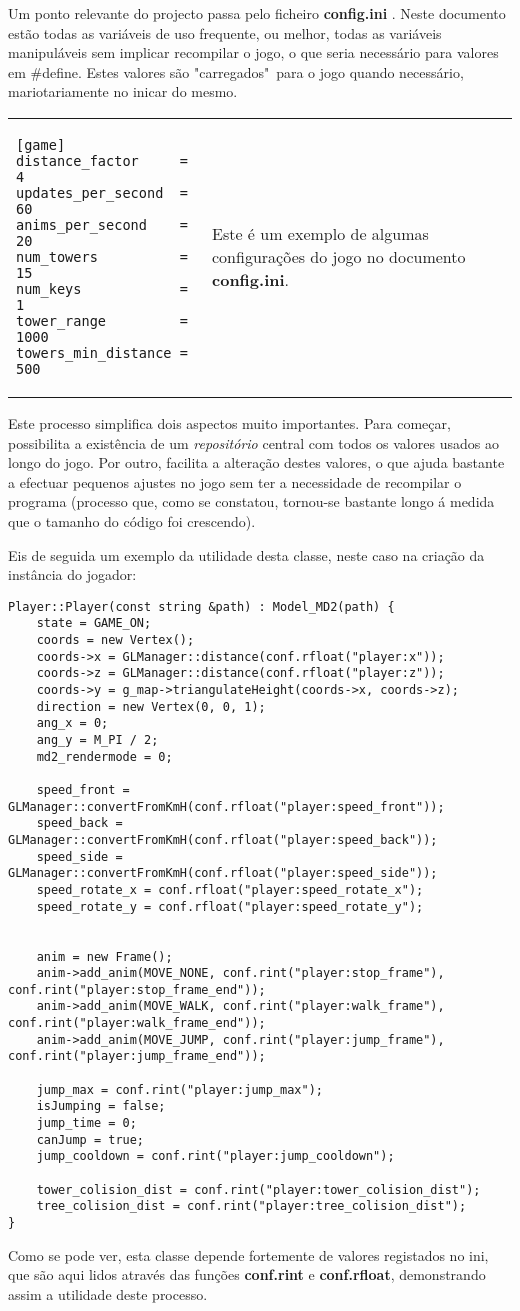 

Um ponto relevante do projecto passa pelo ficheiro {\bf config.ini} . Neste documento estão todas as variáveis de uso frequente, ou melhor, todas as variáveis manipuláveis sem implicar recompilar o jogo, o que seria necessário para valores em \#define. Estes valores são "carregados"\ para o jogo quando necessário, mariotariamente no inicar do mesmo.

\-
\begin{center}
\begin{tabular} {l | p{10cm}}
\begin{lstlisting}
[game]
distance_factor		= 4
updates_per_second	= 60
anims_per_second	= 20
num_towers			= 15
num_keys			= 1
tower_range			= 1000
towers_min_distance = 500
\end{lstlisting} 
& 
Este é um exemplo de algumas configurações do jogo no documento {\bf config.ini}. \\
\end{tabular}
\end{center}

Este processo simplifica dois aspectos muito importantes. Para começar, possibilita a existência de um \emph{repositório} central com todos os valores usados ao longo do jogo. Por outro, facilita a alteração destes valores, o que ajuda bastante a efectuar pequenos ajustes no jogo sem ter a necessidade de recompilar o programa (processo que, como se constatou, tornou-se bastante longo á medida que o tamanho do código foi crescendo).

Eis de seguida um exemplo da utilidade desta classe, neste caso na criação da instância do jogador:

\begin{lstlisting}
Player::Player(const string &path) : Model_MD2(path) {
	state = GAME_ON;
	coords = new Vertex();
	coords->x = GLManager::distance(conf.rfloat("player:x"));
	coords->z = GLManager::distance(conf.rfloat("player:z"));
	coords->y = g_map->triangulateHeight(coords->x, coords->z);
	direction = new Vertex(0, 0, 1);
	ang_x = 0;
	ang_y = M_PI / 2;
	md2_rendermode = 0;

	speed_front = GLManager::convertFromKmH(conf.rfloat("player:speed_front"));
	speed_back = GLManager::convertFromKmH(conf.rfloat("player:speed_back"));
	speed_side = GLManager::convertFromKmH(conf.rfloat("player:speed_side"));
	speed_rotate_x = conf.rfloat("player:speed_rotate_x");
	speed_rotate_y = conf.rfloat("player:speed_rotate_y");


	anim = new Frame();
	anim->add_anim(MOVE_NONE, conf.rint("player:stop_frame"), conf.rint("player:stop_frame_end"));
	anim->add_anim(MOVE_WALK, conf.rint("player:walk_frame"), conf.rint("player:walk_frame_end"));
	anim->add_anim(MOVE_JUMP, conf.rint("player:jump_frame"), conf.rint("player:jump_frame_end"));

	jump_max = conf.rint("player:jump_max");
	isJumping = false;
	jump_time = 0;
	canJump = true;
	jump_cooldown = conf.rint("player:jump_cooldown");

	tower_colision_dist = conf.rint("player:tower_colision_dist");
	tree_colision_dist = conf.rint("player:tree_colision_dist");
}
\end{lstlisting}

Como se pode ver, esta classe depende fortemente de valores registados no ini, que são aqui lidos através das funções \textbf{conf.rint} e \textbf{conf.rfloat}, demonstrando assim a utilidade deste processo.
